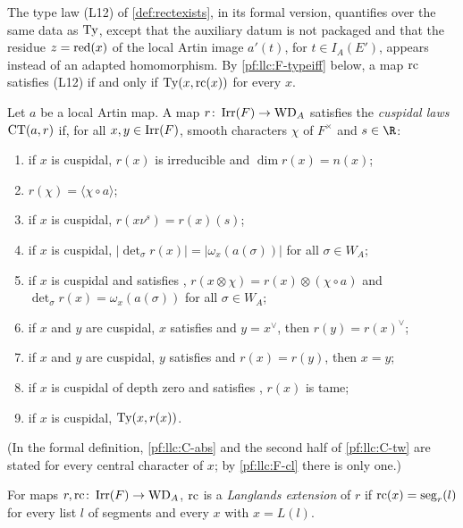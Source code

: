 The type law (L12) of \cref{def:rectexists}, in its formal version, quantifies over the same data as $\operatorname{Ty}$,
except that the auxiliary datum is not packaged and that the residue $z=\operatorname{red}(x)$ of the local Artin image $a'(t)$,
for $t\in I_A(E')$, appears instead of an adapted homomorphism. By \ref{pf:llc:F-typeiff} below, a map $\mathrm{rc}$
satisfies (L12) if and only if $\operatorname{Ty}(x,\mathrm{rc}(x))$ for every $x$.

\begin{definition}\label{pf:llc:def-cuspt}
Let $a$ be a local Artin map. A map $r\colon\operatorname{Irr}(F)\to\mathrm{WD}_A$ satisfies the \emph{cuspidal laws}
$\operatorname{CT}(a,r)$ if, for all $x,y\in\operatorname{Irr}(F)$, smooth characters $\chi$ of $F^\times$ and $s\in\R$:
\begin{enumerate}[label=(C\arabic*),leftmargin=3em]
\item\label{pf:llc:C-irr} if $x$ is cuspidal, $r(x)$ is irreducible and $\dim r(x)=n(x)$;
\item\label{pf:llc:C-one} $r(\chi)=\langle\chi\circ a\rangle$;
\item\label{pf:llc:C-nu} if $x$ is cuspidal, $r(x\nu^s)=r(x)(s)$;
\item\label{pf:llc:C-abs} if $x$ is cuspidal, $|\det_\sigma r(x)|=|\omega_x(a(\sigma))|$ for all $\sigma\in W_A$;
\item\label{pf:llc:C-tw} if $x$ is cuspidal and satisfies \llcGo{}, $r(x\otimes\chi)=r(x)\otimes(\chi\circ a)$
  and $\det_\sigma r(x)=\omega_x(a(\sigma))$ for all $\sigma\in W_A$;
\item\label{pf:llc:C-dual} if $x$ and $y$ are cuspidal, $x$ satisfies \llcGo{} and $y=x^\vee$, then
  $r(y)=r(x)^\vee$;
\item\label{pf:llc:C-inj} if $x$ and $y$ are cuspidal, $y$ satisfies \llcGo{} and $r(x)=r(y)$, then $x=y$;
\item\label{pf:llc:C-depth} if $x$ is cuspidal of depth zero and satisfies \llcGo{}, $r(x)$ is tame;
\item\label{pf:llc:C-type} if $x$ is cuspidal, $\operatorname{Ty}(x,r(x))$.
\end{enumerate}
\end{definition}

(In the formal definition, \ref{pf:llc:C-abs} and the second half of \ref{pf:llc:C-tw} are stated for every
central character of $x$; by \ref{pf:llc:F-cl} there is only one.)

\begin{definition}\label{pf:llc:def-lext}
For maps $r,\mathrm{rc}\colon\operatorname{Irr}(F)\to\mathrm{WD}_A$, $\mathrm{rc}$ is a \emph{Langlands extension} of $r$ if
$\mathrm{rc}(x)=\operatorname{seg}_r(l)$ for every list $l$ of segments and every $x$ with $x=L(l)$.
\end{definition}

